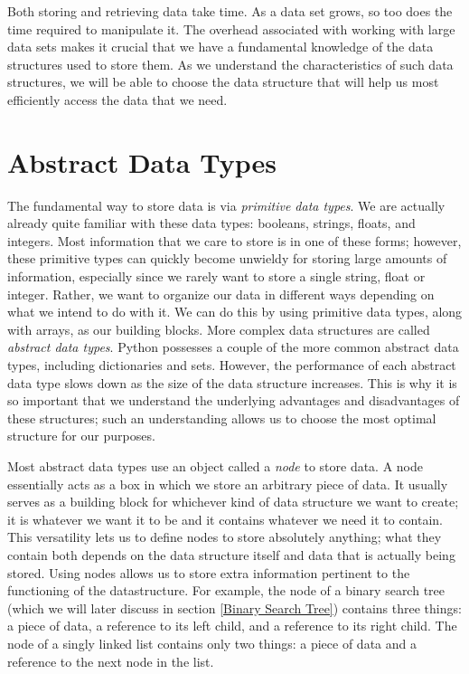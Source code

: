 \label{lab:Python_DataStructures}

Both storing and retrieving data take time. As a data set grows, so too does the time required to manipulate it. 
The overhead associated with working with large data sets makes it crucial that we have a fundamental knowledge of the data structures used to store them.
As we understand the characteristics of such data structures, we will be able to choose the data structure that will help us most efficiently access the data that we need.

\section*{Abstract Data Types}
The fundamental way to store data is via \emph{primitive data types}.
We are actually already quite familiar with these data types: booleans, strings, floats, and integers.
Most information that we care to store is in one of these forms; however, these primitive types can quickly become unwieldy for storing large amounts of information, especially since we rarely want to store a single string, float or integer. Rather, we want to organize our data in different ways depending on what we intend to do with it.
We can do this by using primitive data types, along with arrays, as our building blocks.
More complex data structures are called \emph{abstract data types}.
Python possesses a couple of the more common abstract data types, including dictionaries and sets.
However, the performance of each abstract data type slows down as the size of the data structure increases.
This is why it is so important that we understand the underlying advantages and disadvantages of these structures; such an understanding allows us to choose the most optimal structure for our purposes.

Most abstract data types use an object called a \emph{node} to store data.
A node essentially acts as a box in which we store an arbitrary piece of data.
It usually serves as a building block for whichever kind of data structure we want to create; it is whatever we want it to be and it contains whatever we need it to contain.
This versatility lets us to define nodes to store absolutely anything; what they contain both depends on the data structure itself and data that is actually being stored.
Using nodes allows us to store extra information pertinent to the functioning of the datastructure.
For example, the node of a binary search tree (which we will later discuss in section \ref{Binary Search Tree}) contains three things: a piece of data, a reference to its left child, and a reference to its right child.
The node of a singly linked list contains only two things: a piece of data and a reference to the next node in the list.

